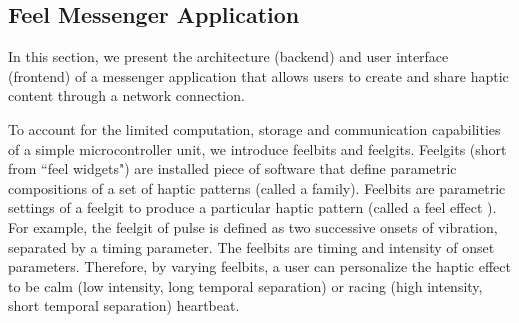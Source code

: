 %
%
%
%
%

\subsection{Feel Messenger Application}
In this section, we present the architecture (backend) and user interface (frontend) of a messenger application that allows users to create and share haptic content through a network connection.

To account for the limited computation, storage and communication capabilities of a simple microcontroller unit, we introduce feelbits and feelgits. Feelgits (short from ``feel widgets") are installed piece of software that define parametric compositions of a set of haptic patterns (called a family). Feelbits are parametric settings of a feelgit to produce a particular haptic pattern (called a feel effect \cite{Israr2014}). For example, the feelgit of pulse is defined as two successive onsets of vibration, separated by a timing parameter. The feelbits are timing and intensity of onset parameters. Therefore, by varying feelbits, a user can personalize the haptic effect to be calm (low intensity, long temporal separation) or racing (high intensity, short temporal separation) heartbeat.

